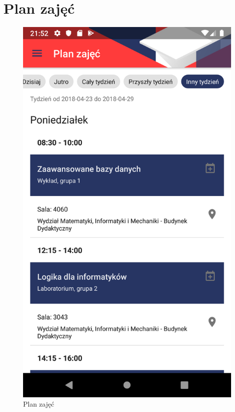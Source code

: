 \documentclass{pracamgr}
\begin{document}
\section{Plan zajęć}

\begin{figure}[p]
	\centering
	\begin{minipage}{0.3\textwidth}
		\centering
		\includegraphics[width=\textwidth]{img/timetable.png}
		\caption{Plan zajęć}\label{fig:timetable}
		\medskip
	\end{minipage}

\end{figure}
\end{document}
